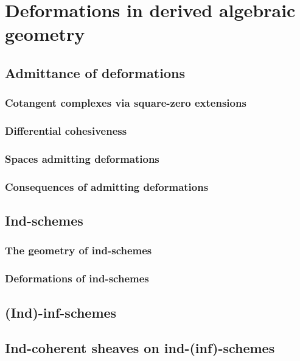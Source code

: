 \section{Deformations in derived algebraic geometry}
    \subsection{Admittance of deformations}
        \subsubsection{Cotangent complexes via square-zero extensions}
    
        \subsubsection{Differential cohesiveness}
    
        \subsubsection{Spaces admitting deformations}
        
        \subsubsection{Consequences of admitting deformations}
        
    \subsection{Ind-schemes}
        \subsubsection{The geometry of ind-schemes}
            
        \subsubsection{Deformations of ind-schemes}
    
    \subsection{(Ind)-inf-schemes}
    
    \subsection{Ind-coherent sheaves on ind-(inf)-schemes}
